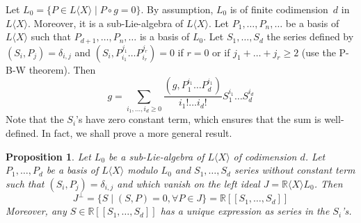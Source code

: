 \documentclass[a4paper,12pt]{article}
\newtheorem{proposition}{Proposition}
\newcommand{\R}{\mathbb{R}}
\newcommand{\Rx}{\R\langle X\rangle}
\newcommand{\Lx}{L\langle X\rangle}
\begin{document}
Let ${L}_0=\{{P} \in \Lx \mid {P} \circ {g}=0\}$. By assumption, ${L}_0$ is of finite codimension~$d$ in $\Lx$. Moreover, it is a sub-Lie-algebra of $\Lx$.
Let $P_1, \ldots, P_n, \ldots$ be a basis of $\Lx$ such that $P_{d+1}, \ldots, P_n, \ldots$ is a basis of $L_0$. 
Let $S_1, \ldots, S_d$ the series defined by $\left(S_i, P_j\right)=\delta_{i, j}$ and $\left(S_i, P_{i_1}^{j_1} \ldots P_{i_r}^{j_r}\right)=0$ if $r=0$ or if $j_1+\ldots+j_r \geq 2$ (use the P-B-W theorem). Then
\begin{equation} \label{eq:3.1} \tag{1}
	g=\sum_{i_1, \ldots, i_d \geq 0} \frac{\left(g, P_1^{i_1} \ldots P_d^{i_1}\right)}{i_{1} ! \ldots i_{d} !} S_1^{i_1} \ldots S_d^{i_d}
\end{equation}
Note that the $S_i$'s have zero constant term, which ensures that the sum is well-defined.
In fact, we shall prove a more general result.

\begin{proposition} \label{p:1}
	Let ${L}_0$ be a sub-Lie-algebra of $\Lx$ of codimension ${d}$. Let ${P}_1, \ldots, {P}_{{d}}$ be a basis of $\Lx$ modulo $L_0$ and $S_1, \dotsc, S_d$ series without constant term such that $\left(S_i, P_j\right)=\delta_{i, j}$ and which vanish on the left ideal ${J}=\Rx L_0$. Then
	\begin{equation*}
		J^\perp =\{{S} \mid({S}, {P})=0,  \forall {P} \in {J}\}=\R \left[\left[{S}_1, \ldots, {S}_{{d}}\right]\right]
	\end{equation*}
	Moreover, any $S \in \R\left[\left[S_1, \ldots, S_d\right]\right]$ has a unique expression as series in the $S_i$'s.
\end{proposition}
\end{document}
